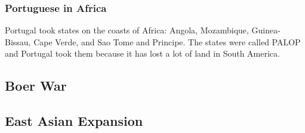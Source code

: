 \subsubsection*{Portuguese in Africa}

Portugal took states on the coasts of Africa:
Angola,
Mozambique,
Guinea-Bissau,
Cape Verde,
and Sao Tome and Principe.
The states were called PALOP and Portugal took them because it has lost a lot of land in South America.

\subsection*{Boer War}

\subsection*{East Asian Expansion}
